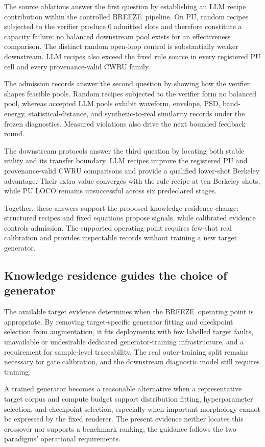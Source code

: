 \documentclass[a4paper,fleqn]{cas-sc}
\newcommand{\breeze}{BREEZE}
\begin{document}
The source ablations answer the first question by establishing an LLM recipe
contribution within the controlled \breeze\ pipeline. On PU, random recipes
subjected to the verifier produce 0 admitted slots and therefore constitute a
capacity failure: no balanced downstream pool exists for an effectiveness
comparison. The distinct random open-loop control is substantially weaker
downstream. LLM recipes also exceed the fixed rule source in every registered
PU cell and every provenance-valid CWRU family.

The admission records answer the second question by showing how the verifier
shapes feasible pools. Random recipes subjected to the verifier form no
balanced pool, whereas accepted LLM pools exhibit waveform, envelope, PSD,
band-energy, statistical-distance, and synthetic-to-real similarity records
under the frozen diagnostics. Measured violations also drive the next bounded
feedback round.

The downstream protocols answer the third question by locating both stable
utility and its transfer boundary. LLM recipes improve the registered PU and
provenance-valid CWRU comparisons and provide a qualified lower-shot Berkeley
advantage. Their extra value converges with the rule recipe at ten Berkeley
shots, while PU LOCO remains unsuccessful across six predeclared stages.

Together, these answers support the proposed knowledge-residence change:
structured recipes and fixed equations propose signals, while calibrated
evidence controls admission. The supported operating point requires few-shot
real calibration and provides inspectable records without training a new target
generator.

\subsection{Knowledge residence guides the choice of generator}

The available target evidence determines when the \breeze\ operating point is
appropriate. By removing target-specific generator fitting and checkpoint
selection from augmentation, it fits deployments with few labelled target
faults, unavailable or undesirable dedicated generator-training infrastructure,
and a requirement for sample-level traceability. The real outer-training split
remains necessary for gate calibration, and the downstream diagnostic model
still requires training.

A trained generator becomes a reasonable alternative when a representative
target corpus and compute budget support distribution fitting, hyperparameter
selection, and checkpoint selection, especially when important morphology
cannot be expressed by the fixed renderer. The present evidence neither locates
this crossover nor supports a benchmark ranking; the guidance follows the two
paradigms' operational requirements.
\end{document}
